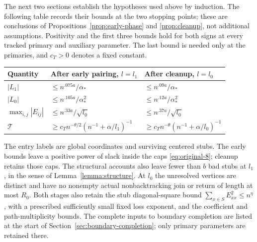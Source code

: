 The next two sections establish the hypotheses used above by induction.
The following table records their bounds at the two stopping points;
these are conclusions of Propositions~\ref{prop:early-phase} and
\ref{prop:cleanup}, not additional assumptions. Positivity and the first
three bounds hold for both signs at every tracked primary and auxiliary
parameter. The last bound is needed only at the primaries, and $c_T>0$
denotes a fixed constant.
\begin{center}
\begin{tabular}{@{}lll@{}}
\toprule
Quantity&After early pairing, $l=l_1$&After cleanup, $l=l_0$\\
\midrule
$|L_1|$&$\le n^{.075a}/\alpha_*$&$\le n^{.09a}/\alpha_*$\\
$|L_0|$&$\le n^{.105a}/\alpha_*^2$&$\le n^{.12a}/\alpha_*^2$\\
$\max_{i,j}|E_{ij}|$&$\le n^{.33a}/\sqrt{l_0}$&$\le n^{.37a}/\sqrt{l_0}$\\
$\mathcal T$&$\ge c_T n^{-\theta/2}(n^{-1}+\alpha/l_1)^{-1}$&
 $\ge c_T n^{-\theta}(n^{-1}+\alpha/l_0)^{-1}$\\
\bottomrule
\end{tabular}
\end{center}
The entry labels are global coordinates and surviving centered stubs.
The early bounds leave a positive power of slack inside the caps
\eqref{eq:original-8}; cleanup retains those caps. The structural accounts
also leave fewer than $b$ bad stubs at $l_1$, in the sense of
Lemma~\ref{lemma:structure}. At $l_0$ the unresolved vertices are distinct
and have no nonempty actual nonbacktracking join or return of length at
most $R_0$. Both stages also retain the stub diagonal-square bound
$\sum_{x\in S}E_{xx}^2\le n^\eta$, with a prescribed sufficiently
small fixed loss exponent, and the coefficient and path-multiplicity
bounds. The complete inputs to boundary completion are listed at the
start of Section~\ref{sec:boundary-completion}; only primary parameters
are retained there.
